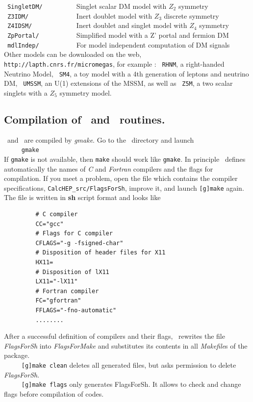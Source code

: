 \documentclass[12pt,a4paper]{article}
\begin{document}
\verb| SingletDM/         | Singlet scalar DM model with $Z_2$ symmetry \cite{McDonald:2001vt} \\ 
\verb| Z3IDM/             |        Inert doublet model  with $Z_3$ discrete
symmetry \cite{Belanger:2012vp,Belanger:2014bga} \\
\verb| Z4IDSM/            |         Inert doublet and singlet model with $Z_4$
symmetry \cite{Belanger:2012vp,Belanger:2014bga} \\  
\verb| ZpPortal/          | Simplified model with a Z' portal  and fermion DM  \\ 
\verb| mdlIndep/          |           For model independent computation of DM signals                                 \\

Other models can be downloaded on the  web,  \verb|http://lapth.cnrs.fr/micromegas|, for example :
\verb| RHNM|, a right-handed Neutrino Model\cite{Belanger:2007dx},          
\verb| SM4|, a toy model with a 4th generation of leptons and neutrino DM, 
\verb| UMSSM|, an   U(1) extensions of the MSSM\cite{DaSilva:2013jga,Belanger:2015cra}, 
as well as \verb| Z5M|, a two scalar singlets with  a $Z_5$ symmetry model.

\subsection{Compilation of \calchep\ and \micro\ routines.}
   \calchep\ and \micro\ are compiled by {\it gmake}. Go to the \micro\ directory
and launch\\
\verb|     gmake|\\
If {\tt gmake} is not available, then {\tt make} should work like {\tt gmake}.
In principle \micro\ defines automatically the names of {\it C} and {\it
Fortran} compilers and the flags for
compilation. If you meet a  problem, open the file which contains the compiler specifications, 
\verb|CalcHEP_src/FlagsForSh|,
 improve it, and launch {\tt [g]make} 
again. The file  is written in {\bf sh} script format and looks like
\begin{verbatim}
         # C compiler
         CC="gcc"
         # Flags for C compiler
         CFLAGS="-g -fsigned-char"
         # Disposition of header files for X11
         HX11=
         # Disposition of lX11
         LX11="-lX11"
         # Fortran compiler
         FC="gfortran"
         FFLAGS="-fno-automatic"
         ........
\end{verbatim}
After a successful definition of compilers and their flags,   \micro\ rewrites the file 
 {\it FlagsForSh} into {\it FlagsForMake} and substitutes its contents in all {\it
Makefile}s of the package.\\
\verb|     [g]make clean|    deletes all generated files, but asks permission to
delete {\it FlagsForSh}.\\
\verb|     [g]make flags|       only generates FlagsForSh. It allows to check and
change  flags before compilation of codes.
\end{document}
